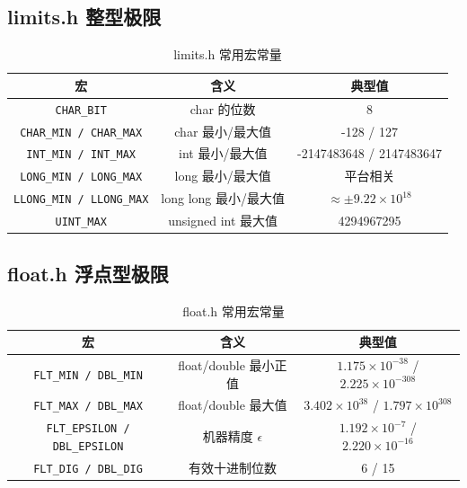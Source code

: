 \subsection{limits.h 整型极限}

\begin{table}[H]
\centering
\renewcommand{\arraystretch}{1.5}
\begin{tabulary}{\linewidth}{CCC}
\toprule
\textbf{宏} & \textbf{含义} & \textbf{典型值} \\ \midrule
\texttt{CHAR\_BIT} & char 的位数 & 8 \\ 
\texttt{CHAR\_MIN / CHAR\_MAX} & char 最小/最大值 & -128 / 127 \\ 
\texttt{INT\_MIN / INT\_MAX} & int 最小/最大值 & -2147483648 / 2147483647 \\ 
\texttt{LONG\_MIN / LONG\_MAX} & long 最小/最大值 & 平台相关 \\ 
\texttt{LLONG\_MIN / LLONG\_MAX} & long long 最小/最大值 & $\approx \pm 9.22 \times 10^{18}$ \\ 
\texttt{UINT\_MAX} & unsigned int 最大值 & 4294967295 \\ \bottomrule
\end{tabulary}
\caption{limits.h 常用宏常量}
\label{tab:limits_consts}
\end{table}

\subsection{float.h 浮点型极限}

\begin{table}[H]
\centering
\renewcommand{\arraystretch}{1.5}
\begin{tabulary}{\linewidth}{CCC}
\toprule
\textbf{宏} & \textbf{含义} & \textbf{典型值} \\ \midrule
\texttt{FLT\_MIN / DBL\_MIN} & float/double 最小正值 & $1.175 \times 10^{-38}$ / $2.225 \times 10^{-308}$ \\ 
\texttt{FLT\_MAX / DBL\_MAX} & float/double 最大值 & $3.402 \times 10^{38}$ / $1.797 \times 10^{308}$ \\ 
\texttt{FLT\_EPSILON / DBL\_EPSILON} & 机器精度 $\epsilon$ & $1.192 \times 10^{-7}$ / $2.220 \times 10^{-16}$ \\ 
\texttt{FLT\_DIG / DBL\_DIG} & 有效十进制位数 & 6 / 15 \\ \bottomrule
\end{tabulary}
\caption{float.h 常用宏常量}
\label{tab:float_consts}
\end{table}

